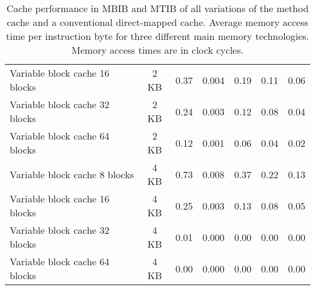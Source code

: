 \begin{table}[htb]
{\begin{tabular}{lcccccc}
    Variable block cache 16 blocks & 2 KB & 0.37 & 0.004 & 0.19 & 0.11 & 0.06 \\
    Variable block cache 32 blocks & 2 KB & 0.24 & 0.003 & 0.12 & 0.08 & 0.04 \\
    Variable block cache 64 blocks & 2 KB & 0.12 & 0.001 & 0.06 & 0.04 & 0.02 \\
    Variable block cache 8 blocks & 4 KB & 0.73 & 0.008  & 0.37 & 0.22 & 0.13 \\
    Variable block cache 16 blocks & 4 KB & 0.25 & 0.003 & 0.13 & 0.08 & 0.05 \\
    Variable block cache 32 blocks & 4 KB & 0.01 & 0.000 & 0.00 & 0.00 & 0.00 \\
    Variable block cache 64 blocks & 4 KB & 0.00 & 0.000 & 0.00 & 0.00 & 0.00 \\

    \bottomrule

    \end{tabular}
}
    \caption[Cache performance compared]{Cache performance in MBIB and MTIB of all variations of
    the method cache and a conventional direct-mapped cache. Average
    memory access time per instruction byte for three different main
    memory technologies. Memory access times are in clock cycles.
    }
    \label{tab_cache_all}
\end{table}


%
